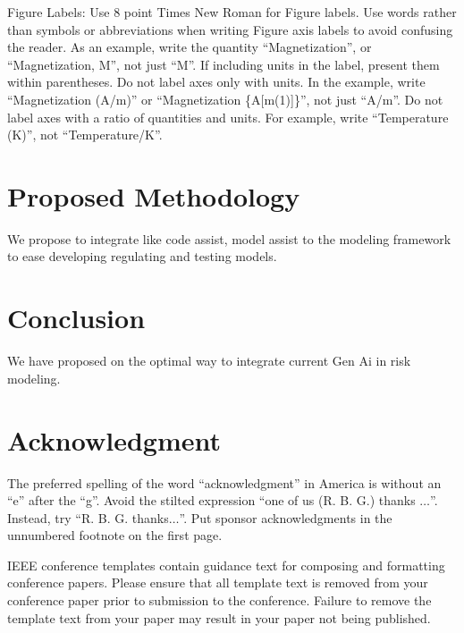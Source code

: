 \documentclass[conference]{IEEEtran}
\begin{document}
Figure Labels: Use 8 point Times New Roman for Figure labels. Use words 
rather than symbols or abbreviations when writing Figure axis labels to 
avoid confusing the reader. As an example, write the quantity 
``Magnetization'', or ``Magnetization, M'', not just ``M''. If including 
units in the label, present them within parentheses. Do not label axes only 
with units. In the example, write ``Magnetization (A/m)'' or ``Magnetization 
\{A[m(1)]\}'', not just ``A/m''. Do not label axes with a ratio of 
quantities and units. For example, write ``Temperature (K)'', not 
``Temperature/K''.


\section{Proposed Methodology}
We propose to integrate like code assist, model assist to the modeling framework to ease developing regulating and testing models.

\section{Conclusion}

We have proposed on the optimal way to integrate current Gen Ai in risk modeling.


\section*{Acknowledgment}

The preferred spelling of the word ``acknowledgment'' in America is without 
an ``e'' after the ``g''. Avoid the stilted expression ``one of us (R. B. 
G.) thanks $\ldots$''. Instead, try ``R. B. G. thanks$\ldots$''. Put sponsor 
acknowledgments in the unnumbered footnote on the first page.





\printbibliography  %



\vspace{12pt}
\color{red}
IEEE conference templates contain guidance text for composing and formatting conference papers. Please ensure that all template text is removed from your conference paper prior to submission to the conference. Failure to remove the template text from your paper may result in your paper not being published.
\end{document}

